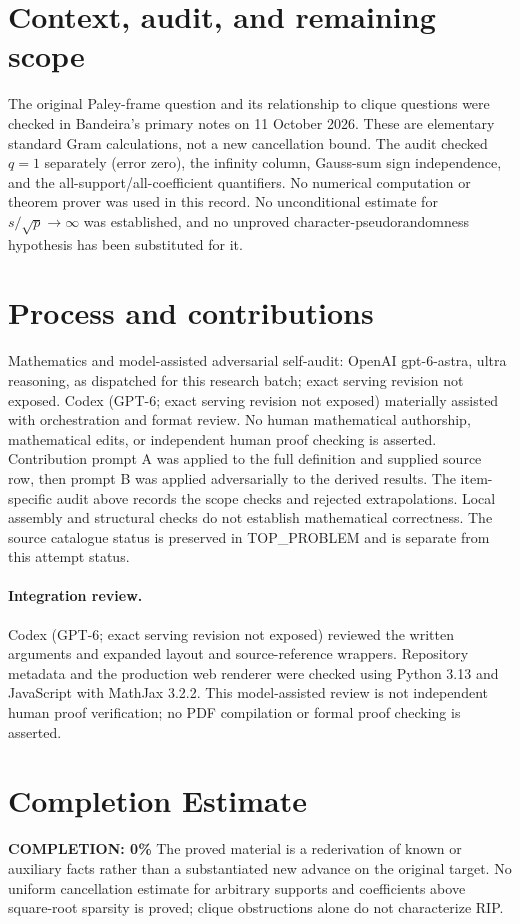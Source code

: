 \documentclass[11pt]{article}
\begin{document}
\section{Context, audit, and remaining scope}
The original Paley-frame question and its relationship to clique questions
were checked in Bandeira's primary notes on 11 October 2026.
These are elementary standard Gram calculations, not a new cancellation
bound. The audit checked $q=1$ separately (error zero), the infinity column,
Gauss-sum sign independence, and the all-support/all-coefficient quantifiers.
No numerical computation or theorem prover was used in this record.
No unconditional estimate for $s/\sqrt p\to\infty$ was established, and no
unproved character-pseudorandomness hypothesis has been substituted for it.

\section{Process and contributions}
Mathematics and model-assisted adversarial self-audit: OpenAI gpt-6-astra, ultra reasoning, as dispatched for this research batch; exact serving revision not exposed. Codex (GPT-6; exact serving revision not exposed) materially assisted with orchestration and format review. No human mathematical authorship, mathematical edits, or independent human proof checking is asserted.
Contribution prompt A was applied to the full definition and supplied source row, then prompt B was applied adversarially to the derived results. The item-specific audit above records the scope checks and rejected extrapolations. Local assembly and structural checks do not establish mathematical correctness. The source catalogue status is preserved in TOP\_PROBLEM and is separate from this attempt status.
\paragraph{Integration review.} Codex (GPT-6; exact serving revision not exposed) reviewed the written arguments and expanded layout and source-reference wrappers. Repository metadata and the production web renderer were checked using Python 3.13 and JavaScript with MathJax 3.2.2. This model-assisted review is not independent human proof verification; no PDF compilation or formal proof checking is asserted.

\section{Completion Estimate}
\noindent\textbf{COMPLETION: 0\%}
The proved material is a rederivation of known or auxiliary facts rather than a substantiated new advance on the original target. No uniform cancellation estimate for arbitrary supports and coefficients above square-root sparsity is proved; clique obstructions alone do not characterize RIP.
\end{document}
